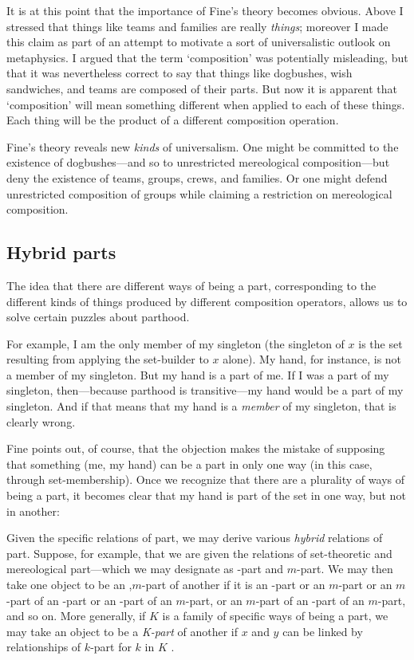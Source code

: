 \documentclass[11pt]{article}
\newenvironment{squote}{%
\begin{spacing}{1}
\begin{list}{}{%
\setlength{\labelwidth}{0pt}%
\rightmargin\leftmargin%
}
\item\relax
}{%
\end{list}%
\end{spacing}
}
\begin{document}
\begin{spacing}{1.5}
It is at this point that the importance of Fine's theory becomes
obvious.  Above I stressed that things like teams and families are
really {\em things}; moreover I made this claim as part of an attempt
to motivate a sort of universalistic outlook on metaphysics.  I argued
that the term `composition' was potentially misleading, but that it
was nevertheless correct to say that things like dogbushes, wish
sandwiches, and teams are composed of their parts.  But now it is
apparent that `composition' will mean something different when applied
to each of these things.  Each thing will be the product of a
different composition operation.

Fine's theory reveals new {\em kinds} of universalism.  One might be
committed to the existence of dogbushes---and so to unrestricted
mereological composition---but deny the existence of teams, groups,
crews, and families.  Or one might defend unrestricted composition of
groups while claiming a restriction on mereological composition.

\subsection{Hybrid parts}
\label{hybrid}
The idea that there are different ways of being a part, corresponding
to the different kinds of things produced by different composition
operators, allows us to solve certain puzzles about parthood.

For example, I am the only member of my singleton (the singleton of
$x$ is the set resulting from applying the set-builder to $x$ alone).
My hand, for instance, is not a member of my singleton.  But my hand
is a part of me.  If I was a part of my singleton, then---because
parthood is transitive---my hand would be a part of my singleton.  And
if that means that my hand is a {\em member} of my singleton, that is
clearly wrong.

Fine points out, of course, that the objection makes the mistake of
supposing that something (me, my hand) can be a part in only one way
(in this case, through set-membership).  Once we recognize that there
are a plurality of ways of being a part, it becomes clear that my hand
is part of the set in one way, but not in another:

\begin{squote}
Given the specific relations of part, we may derive various {\em
  hybrid} relations of part.  Suppose, for example, that we are given
the relations of set-theoretic and mereological part---which we may
designate as \textepsilon -part and $m$-part. We may then take one
object to be an \textepsilon ,$m$-part of another if it is an
\textepsilon -part or an $m$-part or an $m$-part of an \textepsilon
-part or an \textepsilon -part of an $m$-part, or an $m$-part of an
\textepsilon -part of an $m$-part, and so on. More generally, if $K$
is a family of specific ways of being a part, we may take an object to
be a {\em K-part} of another if $x$ and $y$ can be linked by
relationships of $k$-part for $k$ in $K$ \citep[579]{fine2010}.
\end{squote}


\end{spacing}
\end{document}
